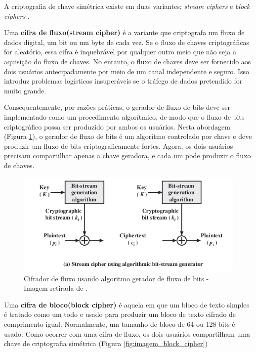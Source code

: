             A criptografia de chave simétrica existe em duas variantes: \textit{stream ciphers} e \textit{block ciphers} \cite{beginnig_blockchain_bikramaditya}.
            
            Uma \textbf{cifra de fluxo(stream cipher)} é a variante que criptografa um fluxo de dados digital, um bit ou um byte de cada vez. Se o fluxo de chaves criptográficas for aleatório, essa cifra é inquebrável por qualquer outro meio que não seja a aquisição do fluxo de chaves. No entanto, o fluxo de chaves deve ser fornecido aos dois usuários antecipadamente por meio de um canal independente e seguro. Isso introduz problemas logísticos insuperáveis se o tráfego de dados pretendido for muito grande.\cite{cryptograpy_and_network_stallings}
            
            Consequentemente, por razões práticas, o gerador de fluxo de bits deve ser implementado como um procedimento algorítmico, de modo que o fluxo de bits criptográfico possa ser produzido por ambos os usuários. Nesta abordagem (Figura \ref{fig:imagem_stream_cipher}), o gerador de fluxo de bits é um algoritmo controlado por chave e deve produzir um fluxo de bits criptograficamente fortes. Agora, os dois usuários precisam compartilhar apenas a chave geradora, e cada um pode produzir o fluxo de chaves.\cite{cryptograpy_and_network_stallings}
        
            
                \begin{figure}[H]
                     \centering
                     \includegraphics[scale=0.7]{figuras/capitulo_2/stream_cipher_generator.png}
                     \caption{Cifrador de fluxo usando algoritmo gerador de fluxo de bits - Imagem retirada de \cite{cryptograpy_and_network_stallings}.}
                     \label{fig:imagem_stream_cipher}
                \end{figure}
        
            Uma \textbf{cifra de bloco(block cipher)} é aquela em que um bloco de texto simples é tratado como um todo e usado para produzir um bloco de texto cifrado de comprimento igual. Normalmente, um tamanho de bloco de 64 ou 128 bits é usado. Como ocorrer com uma cifra de fluxo, os dois usuários compartilham uma chave de criptografia simétrica (Figura \ref{fig:imagem_block_cipher})

